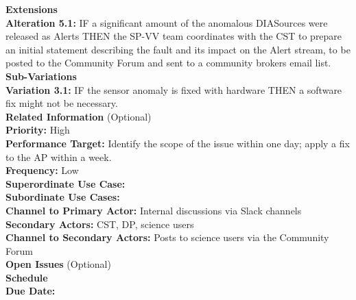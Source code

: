 \textbf{Extensions} \\
\textbf{Alteration 5.1:} IF a significant amount of the anomalous DIASources were released as Alerts THEN the SP-VV team coordinates with the CST to prepare an initial statement describing the fault and its impact on the Alert stream, to be posted to the Community Forum and sent to a community brokers email list. \\

\textbf{Sub-Variations} \\
\textbf{Variation 3.1:} IF the sensor anomaly is fixed with hardware THEN a software fix might not be necessary. \\

\textbf{Related Information} (Optional) \\
\textbf{Priority:} High \\
\textbf{Performance Target:} Identify the scope of the issue within one day; apply a fix to the AP within a week. \\
\textbf{Frequency:} Low \\
\textbf{Superordinate Use Case:} \\
\textbf{Subordinate Use Cases:} \\
\textbf{Channel to Primary Actor:} Internal discussions via Slack channels \\
\textbf{Secondary Actors:} CST, DP, science users \\
\textbf{Channel to Secondary Actors:} Posts to science users via the Community Forum \\

\textbf{Open Issues} (Optional) \\

\textbf{Schedule} \\
\textbf{Due Date:} \\
